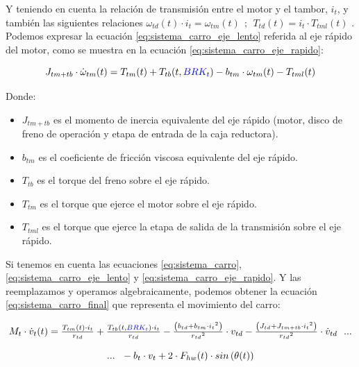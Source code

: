 \documentclass[11pt]{article}
\begin{document}
Y teniendo en cuenta la relación de transmisión entre el motor y el tambor, $i_{t}$, y también las siguientes relaciones $\omega_{td}(t)\cdot i_{t} = \omega_{tm}(t) \ \ ;\ \ T_{td}(t)=i_{t}\cdot T_{tml}(t)$ . Podemos expresar la ecuación \ref{eq:sistema_carro_eje_lento} referida al eje rápido del motor, como se muestra en la ecuación \ref{eq:sistema_carro_eje_rapido}:

\begin{equation}
	\label{eq:sistema_carro_eje_rapido}
	J_{tm+tb}\cdot\dot{\omega}_{tm}(t)=T_{tm}(t)+T_{tb}(t,{\color{blue}BRK_{t}})-b_{tm}\cdot\omega_{tm}(t)-T_{tml}(t)
\end{equation}

Donde:
\begin{itemize}
	\item $J_{tm+tb}$ es el momento de inercia equivalente del eje rápido (motor, disco de freno de operación y etapa de entrada de la caja reductora).
	\item $b_{tm}$ es el coeficiente de fricción viscosa equivalente del eje rápido.
	\item $T_{tb}$ es el torque del freno sobre el eje rápido.
	\item $T_{tm}$ es el torque que ejerce el motor sobre el eje rápido.
	\item $T_{tml}$ es el torque que ejerce la etapa de salida de la transmisión sobre el eje rápido.
\end{itemize}

Si tenemos en cuenta las ecuaciones \ref{eq:sistema_carro}, \ref{eq:sistema_carro_eje_lento} y \ref{eq:sistema_carro_eje_rapido}. Y las reemplazamos y operamos algebraicamente, podemos obtener la ecuación \ref{eq:sistema_carro_final} que representa el movimiento del carro:

\begin{equation}
	\label{eq:sistema_carro_final}
	\begin{matrix}
		M_{t}\cdot\dot{v}_{t}(t)=\frac{T_{tm}(t)\cdot i_{t}}{r_{td}}+\frac{T_{tb}(t,{\color{blue}BRK_{t}})\cdot i_{t}}{r_{td}}-\frac{\left ( b_{td}+b_{tm}\cdot{i_{t}}^{2} \right )}{{r_{td}}^{2}}\cdot v_{td}-\frac{\left ( J_{td}+J_{tm+tb}\cdot{i_{t}}^{2} \right )}{{r_{td}}^{2}}\cdot \dot{v}_{td}\ \ ...
		\\
		\\
		...\ \ -b_{t}\cdot v_{t}+2\cdot F_{hw}(t) \cdot sin \left ( \theta(t) \right )
	\end{matrix}
\end{equation}
\end{document}
